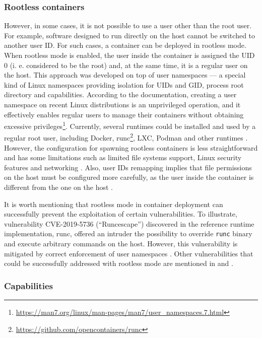 \subsubsection*{Rootless containers}

However, in some cases, it is not possible to use a user other than the root user. For example, software designed to run directly on the host cannot be switched to another user ID. For such cases, a container can be deployed in rootless mode. When rootless mode is enabled, the user inside the container is assigned the UID 0 (i. e. considered to be the root) and, at the same time, it is a regular user on the host. This approach was developed on top of user namespaces — a special kind of Linux namespaces providing isolation for UIDs and GID, process root directory and capabilities. According to the documentation, creating a user namespace on recent Linux distributions is an unprivileged operation, and it effectively enables regular users to manage their containers without obtaining excessive privileges\footnote{\url{https://man7.org/linux/man-pages/man7/user_namespaces.7.html}}. Currently, several runtimes could be installed and used by a regular root user, including Docker, runc\footnote{\url{https://github.com/opencontainers/runc}}, LXC, Podman and other runtimes \cite{d:dockerrootless,s:lxc}. However, the configuration for spawning rootless containers is less straightforward and has some limitations such as limited file systems support, Linux security features and networking \cite{d:dockerrootless}. Also, user IDs remapping implies that file permissions on the host must be configured more carefully, as the user inside the container is different from the one on the host \cite{book:rice}.

It is worth mentioning that rootless mode in container deployment can successfully prevent the exploitation of certain vulnerabilities. To illustrate, vulnerability \linebreak CVE-2019-5736 (``Runcescape'') discovered in the reference runtime implementation, runc, offered an intruder the possibility to override \texttt{runc} binary and execute arbitrary commands on the host. However, this vulnerability is mitigated by correct enforcement of user namespaces \cite{s:CVE-2019-5736}. Other vulnerabilities that could be successfully addressed with rootless mode are mentioned in \cite{c:12} and \cite{d:enhancements}.

\subsubsection*{Capabilities}

